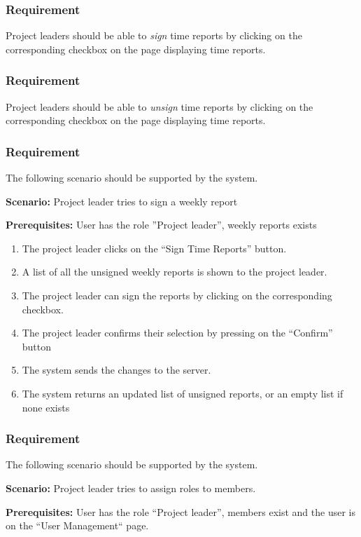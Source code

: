 \documentclass{article}
\begin{document}
\subsubsection{Requirement}
Project leaders should be able to \textit{sign} time reports by clicking on the corresponding checkbox on the page displaying time reports.

\subsubsection{Requirement}
Project leaders should be able to \textit{unsign} time reports by clicking on the corresponding checkbox on the page displaying time reports.

\subsubsection{Requirement}
The following scenario should be supported by the system.

\textbf{Scenario:} Project leader tries to sign a weekly report

\textbf{Prerequisites:} User has the role ”Project leader”, weekly reports exists

\begin{enumerate}
    \item The project leader clicks on the “Sign Time Reports” button.
    \item A list of all the unsigned weekly reports is shown to the project leader.
    \item The project leader can sign the reports by clicking on the corresponding checkbox.
    \item The project leader confirms their selection by pressing on the “Confirm” button
    \item The system sends the changes to the server.
    \item The system returns an updated list of unsigned reports, or an empty list if none exists
\end{enumerate}

\subsubsection{Requirement}
The following scenario should be supported by the system.

\textbf{Scenario:} Project leader tries to assign roles to members.

\textbf{Prerequisites:} User has the role “Project leader”, members exist and the user is on the “User Management“ page.
\end{document}
